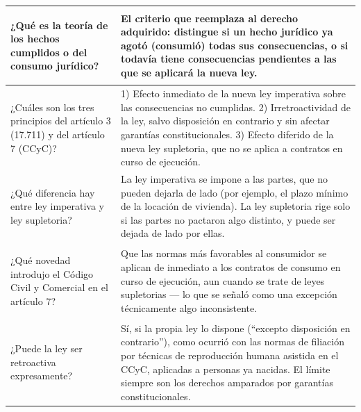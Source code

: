 \documentclass[12pt,oneside]{book}
\begin{document}
\begin{longtable}{>{\bfseries\raggedright\arraybackslash}p{} p{}}
¿Qué es la teoría de los hechos cumplidos o del consumo jurídico? &
El criterio que reemplaza al derecho adquirido: distingue si un hecho jurídico ya agotó (consumió) todas sus consecuencias, o si todavía tiene consecuencias pendientes a las que se aplicará la nueva ley. \\
\midrule

¿Cuáles son los tres principios del artículo 3 (17.711) y del artículo 7 (CCyC)? &
1) Efecto inmediato de la nueva ley imperativa sobre las consecuencias no cumplidas. 2) Irretroactividad de la ley, salvo disposición en contrario y sin afectar garantías constitucionales. 3) Efecto diferido de la nueva ley supletoria, que no se aplica a contratos en curso de ejecución. \\
\midrule

¿Qué diferencia hay entre ley imperativa y ley supletoria? &
La ley imperativa se impone a las partes, que no pueden dejarla de lado (por ejemplo, el plazo mínimo de la locación de vivienda). La ley supletoria rige solo si las partes no pactaron algo distinto, y puede ser dejada de lado por ellas. \\
\midrule

¿Qué novedad introdujo el Código Civil y Comercial en el artículo 7? &
Que las normas más favorables al consumidor se aplican de inmediato a los contratos de consumo en curso de ejecución, aun cuando se trate de leyes supletorias --- lo que se señaló como una excepción técnicamente algo inconsistente. \\
\midrule

¿Puede la ley ser retroactiva expresamente? &
Sí, si la propia ley lo dispone (``excepto disposición en contrario''), como ocurrió con las normas de filiación por técnicas de reproducción humana asistida en el CCyC, aplicadas a personas ya nacidas. El límite siempre son los derechos amparados por garantías constitucionales. \\
\midrule


\end{longtable}
\end{document}
